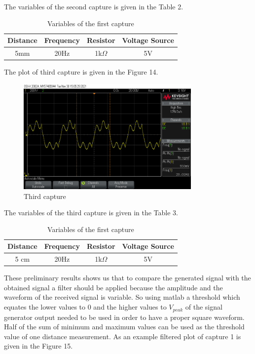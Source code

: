 \documentclass[letterpaper,12pt]{article}
\begin{document}
The variables of the second capture is given in the Table 2.
\begin{table}[H]
	\begin{center}
		\caption{Variables of the first capture}
		\vspace{2mm}
		\begin{tabular}{||c | c | c | c||} 
		 \hline
		 Distance & Frequency & Resistor & Voltage Source\\ [0.5ex] 
		 \hline\hline
		  5mm & 20Hz &  1k\( \Omega \) & 5V  \\ 
		 \hline
		\end{tabular}
	\end{center}
	\end{table}
The plot of third capture is given in the Figure 14.
\begin{figure}[H]
	\centering
   \includegraphics[width=0.8\textwidth]{capture3_ss 0.png}
   \caption{Third capture}
\end{figure} 
The variables of the third capture is given in the Table 3.
\begin{table}[H]
	\begin{center}
		\caption{Variables of the first capture}
		\vspace{2mm}
		\begin{tabular}{||c | c | c | c||} 
		 \hline
		 Distance & Frequency & Resistor & Voltage Source\\ [0.5ex] 
		 \hline\hline
		  5 cm & 20Hz &  1k\( \Omega \) & 5V  \\ 
		 \hline
		\end{tabular}
	\end{center}
	\end{table}
These preliminary results shows us that to compare the generated signal with the obtained signal a filter should be applied because the amplitude and the waveform of the received signal is variable. So using matlab a threshold which equates the  lower values to 0 and the higher values to \(V_{peak}\) of the signal generator output needed to be used in order to have a proper square waveform. Half of the sum of minimum and maximum values can be used as the threshold value of one distance measurement. As an example filtered plot of capture 1 is given in the Figure 15.
\end{document}
